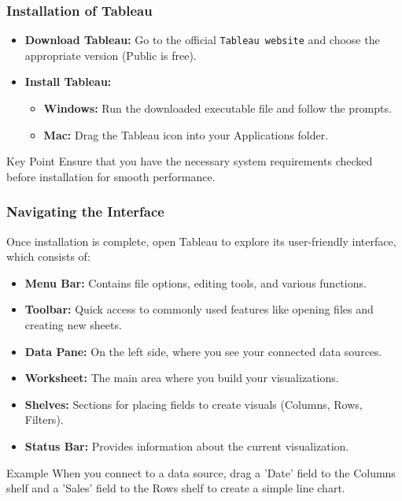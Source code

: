 \documentclass{beamer}
\begin{document}
\begin{frame}[fragile]
    \frametitle{Installation of Tableau}
    \begin{itemize}
        \item \textbf{Download Tableau:} Go to the official \texttt{Tableau website} and choose the appropriate version (Public is free).
        \item \textbf{Install Tableau:}
        \begin{itemize}
            \item \textbf{Windows:} Run the downloaded executable file and follow the prompts.
            \item \textbf{Mac:} Drag the Tableau icon into your Applications folder.
        \end{itemize}
    \end{itemize}
    
    \begin{block}{Key Point}
        Ensure that you have the necessary system requirements checked before installation for smooth performance.
    \end{block}
\end{frame}

\begin{frame}[fragile]
    \frametitle{Navigating the Interface}
    Once installation is complete, open Tableau to explore its user-friendly interface, which consists of:
    \begin{itemize}
        \item \textbf{Menu Bar:} Contains file options, editing tools, and various functions.
        \item \textbf{Toolbar:} Quick access to commonly used features like opening files and creating new sheets.
        \item \textbf{Data Pane:} On the left side, where you see your connected data sources.
        \item \textbf{Worksheet:} The main area where you build your visualizations.
        \item \textbf{Shelves:} Sections for placing fields to create visuals (Columns, Rows, Filters).
        \item \textbf{Status Bar:} Provides information about the current visualization.
    \end{itemize}
    
    \begin{block}{Example}
        When you connect to a data source, drag a 'Date' field to the Columns shelf and a 'Sales' field to the Rows shelf to create a simple line chart.
    \end{block}
\end{frame}
\end{document}
